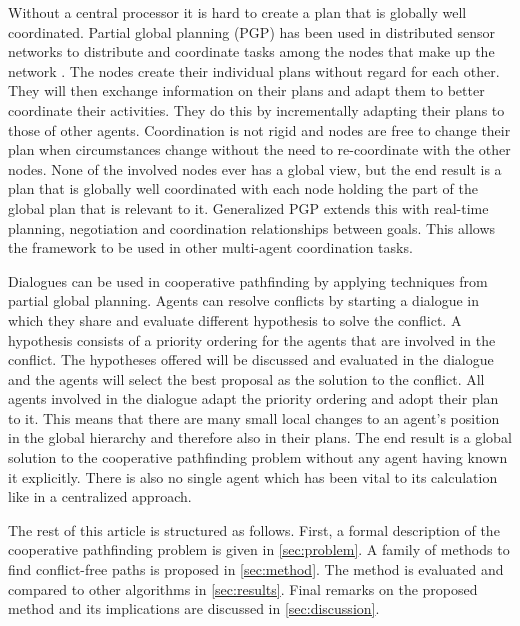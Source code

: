 Without a central processor it is hard to create a plan that is globally well
coordinated. Partial global planning (PGP) has been used in distributed sensor
networks to distribute and coordinate tasks among the nodes that make up the
network \cite[pp.~202--204]{durfee1991,woodridge2009}. The nodes create their 
individual plans without
regard for each other. They will then exchange information on their plans and
adapt them to better coordinate their activities. They do this by incrementally 
adapting their plans to those of other agents. Coordination is not rigid and
nodes are free to change their plan when circumstances change without the need 
to re-coordinate with the other nodes. None of the involved nodes ever has a 
global view, but the end result is a plan that is globally well
coordinated with each node holding the part of the global plan that is relevant
to it. Generalized PGP \cite{decker1992} extends this with real-time planning, 
negotiation and coordination relationships between goals. This allows the 
framework to be used in other multi-agent coordination tasks.

Dialogues can be used in cooperative pathfinding by applying techniques from
partial global planning. Agents can resolve conflicts by starting a dialogue in
which they share and evaluate different hypothesis to solve the conflict. A
hypothesis consists of a priority ordering for the agents that are involved in
the conflict. The hypotheses offered will be discussed and evaluated in the
dialogue and the agents will select the best proposal as the solution
to the conflict. All agents involved in the dialogue adapt the priority
ordering and adopt their plan to it. This means that there are many small local
changes to an agent's position in the global hierarchy and therefore also in
their plans. The end result is a global solution to the cooperative pathfinding
problem without any agent having known it explicitly. There is also no single
agent which has been vital to its calculation like in a centralized approach.

The rest of this article is structured as follows. First, a formal description
of the cooperative pathfinding problem is given in \autoref{sec:problem}.
A family of methods to find
conflict-free paths is proposed in \autoref{sec:method}. The method is
evaluated and compared to other algorithms in \autoref{sec:results}. Final
remarks on the proposed method and its implications are discussed in
\autoref{sec:discussion}.
